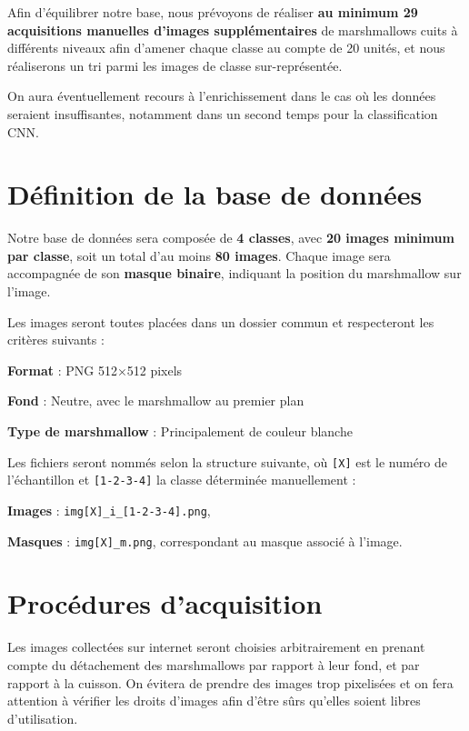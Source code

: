 \documentclass[11pt, openright]{book}
\begin{document}
    Afin d’équilibrer notre base, nous prévoyons de réaliser \textbf{au minimum 29 acquisitions manuelles d’images supplémentaires} de marshmallows cuits à différents niveaux afin d’amener chaque classe au compte de 20 unités, et nous réaliserons un tri parmi les images de classe sur-représentée.
    
    On aura éventuellement recours à l’enrichissement dans le cas où les données seraient insuffisantes, notamment dans un second temps pour la classification CNN.
    
\section{Définition de la base de données}
    Notre base de données sera composée de \textbf{4 classes}, avec \textbf{20 images minimum par classe}, soit un total d’au moins \textbf{80 images}. Chaque image sera accompagnée de son \textbf{masque binaire}, indiquant la position du marshmallow sur l’image.
    
    Les images seront toutes placées dans un dossier commun et respecteront les critères suivants :
    \begin{items}[-5pt]{-30pt}{-15pt}
        \item \textbf{Format} : PNG 512×512 pixels
        \item \textbf{Fond} : Neutre, avec le marshmallow au premier plan
        \item \textbf{Type de marshmallow} : Principalement de couleur blanche
    \end{items}
    
    Les fichiers seront nommés selon la structure suivante, où \texttt{[X]} est le numéro de l’échantillon et \texttt{[1-2-3-4]} la classe déterminée manuellement :
    \begin{items}[-5pt]{-15pt}{-15pt}
        \item \textbf{Images} : \texttt{img[X]\_i\_[1-2-3-4].png},
        \item \textbf{Masques} : \texttt{img[X]\_m.png}, correspondant au masque associé à l’image.
    \end{items}

\newpage
    
\section{Procédures d’acquisition}
    Les images collectées sur internet seront choisies arbitrairement en prenant compte du détachement des marshmallows par rapport à leur fond, et par rapport à la cuisson. On évitera de prendre des images trop pixelisées et on fera attention à vérifier les droits d’images afin d’être sûrs qu’elles soient libres d’utilisation.
    
\end{document}
